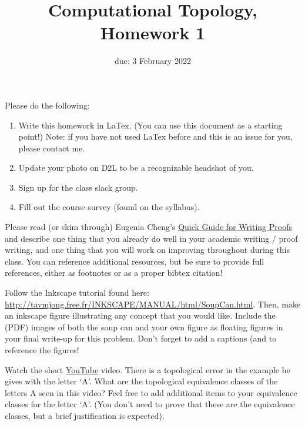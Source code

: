 \documentclass{article}
\title{Computational Topology, Homework 1}
\author{\todo{your name here}}
\date{due: 3 February 2022}
\begin{document}
\maketitle




Please do the following:
\begin{enumerate}
    \item Write this homework in LaTex.  (You can use this document as a
        starting point!)  Note: if you have not used LaTex before and this is an
        issue for you, please contact me.
    \item Update your photo on D2L to be a recognizable headshot of you.
    \item Sign up for the class slack group.
    \item Fill out the course survey (found on the syllabus).
\end{enumerate}

\nextprob{}

Please read (or skim through) Eugenia Cheng’s
\href{http://eugeniacheng.com/wp-content/uploads/2017/02/cheng-proofguide.pdf}{Quick Guide for Writing
Proofs}
and describe one thing
that you already do well in your academic writing / proof writing,
and one thing that you will work on improving
throughout during this class.  You can reference additional resources, but be
sure to provide full references, either as footnotes or as a proper bibtex
citation!

\nextprob{}

Follow the Inkscape tutorial found here:
\url{http://tavmjong.free.fr/INKSCAPE/MANUAL/html/SoupCan.html}.
Then, make an
inkscape figure illustrating any concept that you would like.
Include the (PDF) images of both the soup can and your own figure as
floating figures in
your final write-up for this problem.  Don't forget to add a captions (and to
reference the figures!

\nextprob{}
 Watch the short \href{https://www.ayasdi.com/resources/professor-gunnar-carlsson-introduces-topological-data-analysis/}{YouTube} video.
 There is a topological
 error in the example he gives with the letter `A'.  What are the topological equivalence
classes of the letters A seen in this video?  Feel free to add additional
items to your equivalence classes for the letter `A'.  (You don't need to prove
that these are the equivalence classes, but a brief justification is expected).
\end{document}
